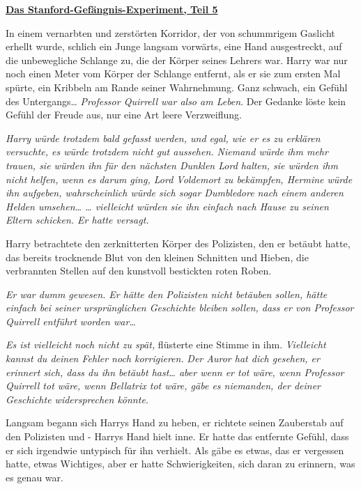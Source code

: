 

\hypertarget{das-stanford-gefuxe4ngnis-experiment-teil-5}{%

\textbf{\uline{Das Stanford-Gefängnis-Experiment, Teil 5}}

In einem vernarbten und zerstörten Korridor, der von schummrigem Gaslicht erhellt wurde, schlich ein Junge langsam vorwärts, eine Hand ausgestreckt, auf die unbewegliche Schlange zu, die der Körper seines Lehrers war. Harry war nur noch einen Meter vom Körper der Schlange entfernt, als er sie zum ersten Mal spürte, ein Kribbeln am Rande seiner Wahrnehmung. Ganz schwach, ein Gefühl des Untergangs… \emph{Professor Quirrell war also am Leben}. Der Gedanke löste kein Gefühl der Freude aus, nur eine Art leere Verzweiflung.

\emph{Harry würde trotzdem bald gefasst werden, und egal, wie er es zu erklären versuchte, es würde trotzdem nicht gut aussehen. Niemand würde ihm mehr trauen, sie würden ihn für den nächsten Dunklen Lord halten, sie würden ihm nicht helfen, wenn es darum ging, Lord Voldemort zu bekämpfen, Hermine würde ihn aufgeben, wahrscheinlich würde sich sogar Dumbledore nach einem anderen Helden umsehen… … vielleicht würden sie ihn einfach nach Hause zu seinen Eltern schicken. Er hatte versagt.}

Harry betrachtete den zerknitterten Körper des Polizisten, den er betäubt hatte, das bereits trocknende Blut von den kleinen Schnitten und Hieben, die verbrannten Stellen auf den kunstvoll bestickten roten Roben.

\emph{Er war dumm gewesen. Er hätte den Polizisten nicht betäuben sollen, hätte einfach bei seiner ursprünglichen Geschichte bleiben sollen, dass er von Professor Quirrell entführt worden war…}

\emph{Es ist vielleicht noch nicht zu spät,} flüsterte eine Stimme in ihm. \emph{Vielleicht kannst du deinen Fehler noch korrigieren.} \emph{Der Auror hat dich gesehen, er erinnert sich, dass du ihn betäubt hast… aber wenn er tot wäre, wenn Professor Quirrell tot wäre, wenn Bellatrix tot wäre, gäbe es niemanden, der deiner Geschichte widersprechen könnte.}

Langsam begann sich Harrys Hand zu heben, er richtete seinen Zauberstab auf den Polizisten und - Harrys Hand hielt inne. Er hatte das entfernte Gefühl, dass er sich irgendwie untypisch für ihn verhielt. Als gäbe es etwas, das er vergessen hatte, etwas Wichtiges, aber er hatte Schwierigkeiten, sich daran zu erinnern, was es genau war.

}

